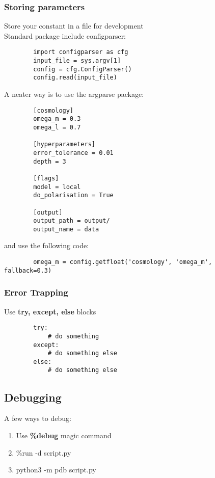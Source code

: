 \documentclass[12pt,a4paper]{article}
\begin{document}
\subsubsection{Storing parameters}
    Store your constant in a file for development\\
    Standard package include configparser:
    \begin{lstlisting}
        import configparser as cfg
        input_file = sys.argv[1]
        config = cfg.ConfigParser()
        config.read(input_file)
    \end{lstlisting}
    A neater way is to use the argparse package:
    \begin{lstlisting}
        [cosmology]
        omega_m = 0.3
        omega_l = 0.7

        [hyperparameters]
        error_tolerance = 0.01
        depth = 3

        [flags]
        model = local
        do_polarisation = True

        [output]
        output_path = output/
        output_name = data
    \end{lstlisting}
    and use the following code:
    \begin{lstlisting}
        omega_m = config.getfloat('cosmology', 'omega_m', fallback=0.3)
    \end{lstlisting}

\subsubsection{Error Trapping}
    Use \textbf{try, except, else} blocks
    \begin{lstlisting}
        try:
            # do something
        except:
            # do something else
        else:
            # do something else
    \end{lstlisting}
\subsection{Debugging}
    A few ways to debug:
    \begin{enumerate}
        \item Use \textbf{\%debug} magic command\\
        \item \%run -d script.py\\
        \item python3 -m pdb script.py\\
    \end{enumerate}
\end{document}

